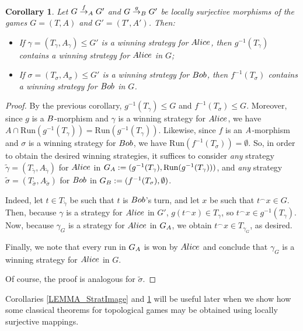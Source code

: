 \documentclass[12pt]{amsart}
\newtheorem{cor}[thm]{Corollary}
\theoremstyle{definition}
\newcommand{\ali}{\textup{\textmd{\textsc{Alice}}}}
\newcommand{\bob}{\textup{\textmd{\textsc{Bob}}}}
\newcommand{\A}{\textup{\textmd{\textsc{A}}}}
\newcommand{\B}{\textup{\textmd{\textsc{B}}}}
\newcommand{\Run}{{\mathrm{Run}}}
\begin{document}
\begin{cor}\label{LEMMA_StratPreimage}
	Let $G\stackrel{f}{\to}_\A G'$ and $G\stackrel{g}{\to}_\B G'$ be locally surjective morphisms of the games $G=(T,A)$ and $G'=(T',A')$. Then:
	\begin{itemize}
		\item[(a)] If $\gamma=(T_\gamma,A_\gamma)\le G'$ is a winning strategy for $\ali$, then $g^{-1}(T_\gamma)$ contains a winning strategy for $\ali$ in $G$;
		\item[(b)] If $\sigma =(T_\sigma,A_\sigma)\le G'$ is a winning strategy for $\bob$, then $f^{-1}(T_\sigma)$ contains a winning strategy for $\bob$ in $G$.
	\end{itemize}
\end{cor}
\begin{proof}
	By the previous corollary, $g^{-1}(T_\gamma)\le G$ and $f^{-1}(T_\sigma)\le G$. Moreover, since $g$ is a $\B$-morphism and $\gamma$ is a winning strategy for $\ali$, we have $A\cap \Run(g^{-1}(T_\gamma))=\Run(g^{-1}(T_\gamma))$. Likewise, since $f$ is an $\A$-morphism and $\sigma$ is a winning strategy for $\bob$, we have $\Run(f^{-1}(T_\sigma))=\emptyset$. So, in order to obtain the desired winning strategies, it suffices to consider \textit{any} strategy $\tilde{\gamma}=(T_{\tilde{\gamma}},A_{\tilde{\gamma}})$ for $\ali$ in $G_\A:=(g^{-1}(T_\gamma),\Run(g^{-1}(T_\gamma)))$, and \textit{any} strategy $\tilde{\sigma}=(T_{\tilde{\sigma}},A_{\tilde{\sigma}})$ for $\bob$ in $G_\B:=(f^{-1}(T_\sigma),\emptyset)$.
	
	Indeed, let $t\in T_{\tilde{\gamma}}$ be such that $t$ is $\bob$'s turn, and let $x$ be such that $t^\smallfrown x\in G$.
	Then, because $\gamma$ is a strategy for $\ali$ in $G'$, $g(t^\smallfrown x)\in T_\gamma$, so $t^\smallfrown x\in g^{-1}(T_\gamma)$. Now, because $\gamma_G$ is a strategy for $\ali$ in $G_\A$, we obtain $t^\smallfrown x\in T_{\gamma_G}$, as desired.
	
	Finally, we note that every run in $G_\A$ is won by $\ali$ and conclude that $\gamma_G$ is a winning strategy for $\ali$ in $G$.
	
	Of course, the proof is analogous for $\tilde{\sigma}$.
\end{proof}


Corollaries \ref{LEMMA_StratImage} and \ref{LEMMA_StratPreimage} will be useful later when we show how some classical theorems for topological games may be obtained using locally surjective mappings.
\end{document}
